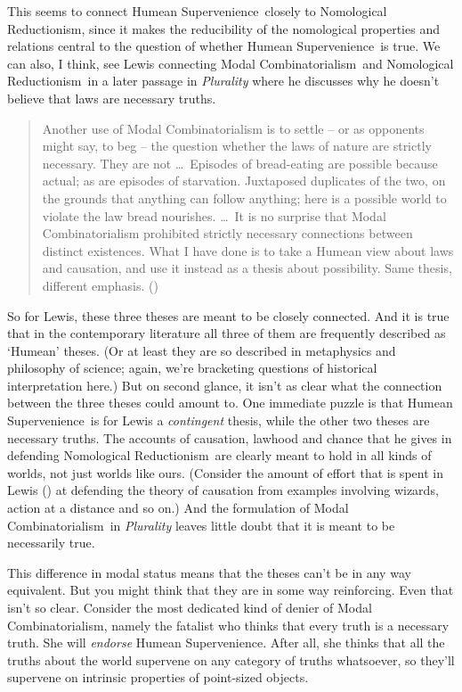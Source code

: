 \documentclass[
  10pt,
  letterpaper,
  DIV=11,
  numbers=noendperiod,
  twoside]{scrartcl}
\begin{document}
This seems to connect Humean Supervenience~closely to Nomological
Reductionism, since it makes the reducibility of the nomological
properties and relations central to the question of whether Humean
Supervenience~is true. We can also, I think, see Lewis connecting Modal
Combinatorialism~and Nomological Reductionism~in a later passage in
\emph{Plurality} where he discusses why he doesn't believe that laws are
necessary truths.

\begin{quote}
Another use of Modal Combinatorialism is to settle -- or as opponents
might say, to beg -- the question whether the laws of nature are
strictly necessary. They are not \ldots~Episodes of bread-eating are
possible because actual; as are episodes of starvation. Juxtaposed
duplicates of the two, on the grounds that anything can follow anything;
here is a possible world to violate the law bread nourishes. \ldots~It
is no surprise that Modal Combinatorialism prohibited strictly necessary
connections between distinct existences. What I have done is to take a
Humean view about laws and causation, and use it instead as a thesis
about possibility. Same thesis, different emphasis.
()
\end{quote}

So for Lewis, these three theses are meant to be closely connected. And
it is true that in the contemporary literature all three of them are
frequently described as `Humean' theses. (Or at least they are so
described in metaphysics and philosophy of science; again, we're
bracketing questions of historical interpretation here.) But on second
glance, it isn't as clear what the connection between the three theses
could amount to. One immediate puzzle is that Humean Supervenience~is
for Lewis a \emph{contingent} thesis, while the other two theses are
necessary truths. The accounts of causation, lawhood and chance that he
gives in defending Nomological Reductionism~are clearly meant to hold in
all kinds of worlds, not just worlds like ours. (Consider the amount of
effort that is spent in Lewis () at
defending the theory of causation from examples involving wizards,
action at a distance and so on.) And the formulation of Modal
Combinatorialism~in \emph{Plurality} leaves little doubt that it is
meant to be necessarily true.

This difference in modal status means that the theses can't be in any
way equivalent. But you might think that they are in some way
reinforcing. Even that isn't so clear. Consider the most dedicated kind
of denier of Modal Combinatorialism, namely the fatalist who thinks that
every truth is a necessary truth. She will \emph{endorse} Humean
Supervenience. After all, she thinks that all the truths about the world
supervene on any category of truths whatsoever, so they'll supervene on
intrinsic properties of point-sized objects.
\end{document}
